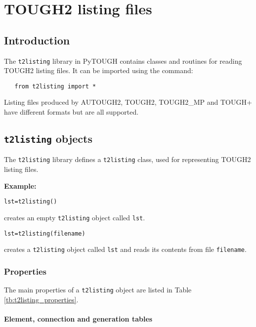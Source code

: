 \chapter{TOUGH2 listing files}
\label{listingfiles}

\section{Introduction}
The \texttt{t2listing} library in PyTOUGH contains classes and routines for reading TOUGH2 listing files.  It can be imported using the command:

\begin{verbatim}
   from t2listing import *
\end{verbatim}

Listing files produced by AUTOUGH2, TOUGH2, TOUGH2\_MP and TOUGH+ have different formats but are all supported.

\section{\texttt{t2listing} objects}

The \texttt{t2listing} library defines a \texttt{t2listing} class, used for representing TOUGH2 listing files.

\textbf{Example:}

\begin{verbatim}
lst=t2listing()
\end{verbatim}

creates an empty \texttt{t2listing} object called \texttt{lst}.

\begin{verbatim}
lst=t2listing(filename)
\end{verbatim}

creates a \texttt{t2listing} object called \texttt{lst} and reads its contents from file \texttt{filename}.

\subsection{Properties}

The main properties of a \texttt{t2listing} object are listed in Table \ref{tb:t2listing_properties}.

\subsubsection{Element, connection and generation tables}

